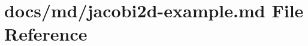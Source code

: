 \hypertarget{jacobi2d-example_8md}{}\section{docs/md/jacobi2d-\/example.md File Reference}
\label{jacobi2d-example_8md}
